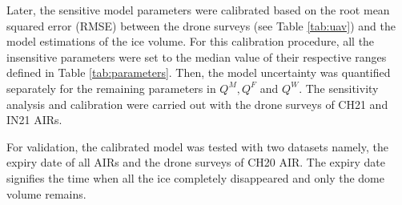 \documentclass[utf8]{frontiersSCNS}
\begin{document}
Later, the sensitive model parameters were calibrated based on the root mean squared error (RMSE) between the
drone surveys (see Table \ref{tab:uav}) and the model estimations of the ice volume. For this calibration
procedure, all the insensitive parameters were set to the median value of their respective ranges defined in
Table \ref{tab:parameters}. Then, the model uncertainty was quantified separately for the remaining parameters
in $Q^M, Q^F$ and $Q^W$. The sensitivity analysis and calibration were carried out with the drone surveys of CH21
and IN21 AIRs. 

For validation, the calibrated model was tested with two datasets namely, the expiry date of all AIRs and the
drone surveys of CH20 AIR. The expiry date signifies the time when all the ice completely disappeared and only
the dome volume remains.
\end{document}
